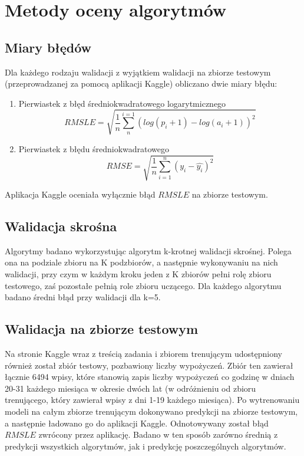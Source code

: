 \documentclass[a4paper,12pt]{article}
\begin{document}
\section{Metody oceny algorytmów}

    \subsection{Miary błędów}
    Dla każdego rodzaju walidacji z wyjątkiem walidacji na zbiorze testowym (przeprowadzanej za pomocą aplikacji Kaggle) obliczano dwie miary błędu:
    \begin{enumerate}
        \item Pierwiastek z błęd średniokwadratowego logarytmicznego $$RMSLE = \sqrt{\frac{1}{n}\sum_{n}^{i=1}(log(p_i + 1) - log(a_i + 1))^2}$$

        \item Pierwiastek z błędu średniokwadratowego $$RMSE = \sqrt{\frac{1}{n}\sum_{i=1}^{n}(y_i - \hat{y_i})^2}$$
     \end{enumerate}
    Aplikacja Kaggle oceniała wyłącznie błąd $RMSLE$ na zbiorze testowym.
    
    \subsection{Walidacja skrośna}
    Algorytmy badano wykorzystując algorytm k-krotnej walidacji skrośnej. Polega ona na podziale zbioru na K podzbiorów, a następnie wykonywaniu na nich 
    walidacji, przy czym w każdym kroku jeden z K zbiorów pełni rolę zbioru testowego, zaś pozostałe pełnią role zbioru uczącego. Dla każdego algorytmu 
    badano średni błąd przy walidacji dla k=5.
    \subsection{Walidacja na zbiorze testowym}       
    Na stronie Kaggle wraz z treścią zadania i zbiorem trenującym udostępniony również został zbiór testowy, pozbawiony liczby wypożyczeń. 
    Zbiór ten zawierał łącznie 6494 wpisy, które stanowią zapis liczby wypożyczeń co godzinę w dniach 20-31 każdego miesiąca w okresie dwóch lat
    (w odróżnieniu od zbioru trenującego, który zawierał wpisy z dni 1-19 każdego miesiąca).
    Po wytrenowaniu
    modeli na całym zbiorze trenującym dokonywano predykcji na zbiorze testowym, a następnie ładowano go do aplikacji Kaggle. Odnotowywany został błąd 
    $RMSLE$ zwrócony przez aplikację. Badano w ten sposób zarówno średnią z predykcji wszystkich algorytmów, jak i predykcję poszczególnych algorytmów.
    
\end{document}
